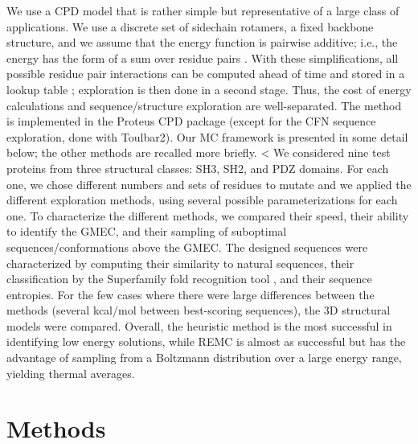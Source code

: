 We use a CPD model that is rather simple but representative of a large class of applications. We use a discrete
set of sidechain rotamers, a fixed backbone structure, and we assume that the energy function is pairwise additive;
i.e., the energy has the form of a sum over residue pairs \cite{Schmidt08b,Schmidt08,Simonson13b}. With these
simplifications, all possible residue pair interactions can be computed ahead of time and stored in a lookup table
\cite{Dahiyat97}; exploration is then done in a second stage. Thus, the cost of energy calculations and
sequence/structure exploration are well-separated. The method is implemented in the Proteus CPD package
\cite{Schmidt08,Simonson13b} (except for the CFN sequence exploration, done with Toulbar2). Our MC framework is
presented in some detail below; the other methods are recalled more briefly.
<
We considered nine test proteins from three structural classes: SH3, SH2, and PDZ domains. For each one, we chose
different numbers and sets of residues to mutate and we applied the different exploration methods, using several
possible parameterizations for each one. To characterize the different methods, we compared their speed, their
ability to identify the GMEC, and their sampling of suboptimal sequences/conformations above the GMEC. The
designed sequences were characterized by computing their similarity to natural sequences, their classification
by the Superfamily fold recognition tool \cite{Gough01,Wilson07}, and their sequence entropies. For the few cases
where there were large differences between the methods (several kcal/mol between best-scoring sequences), the 3D
structural models were compared. Overall, the heuristic method is the most successful in identifying low energy
solutions, while REMC is almost as successful but has the advantage of sampling from a Boltzmann distribution over
a large energy range, yielding thermal averages.

\section{Methods}
